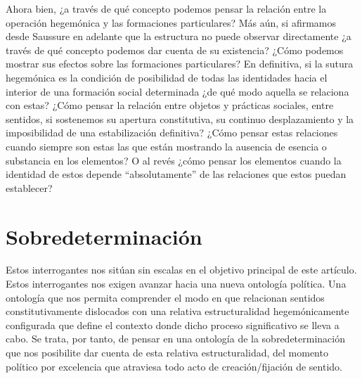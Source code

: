 Ahora bien, ¿a través de qué concepto podemos pensar la relación entre la operación hegemónica y las formaciones particulares? Más aún, si afirmamos desde Saussure en adelante que la estructura no puede observar directamente ¿a través de qué concepto podemos dar cuenta de su existencia? ¿Cómo podemos mostrar sus efectos sobre las formaciones particulares? En definitiva, si la sutura hegemónica es la condición de posibilidad de todas las identidades hacia el interior de una formación social determinada ¿de qué modo aquella se relaciona con estas? ¿Cómo pensar la relación entre objetos y prácticas sociales, entre sentidos, si sostenemos su apertura constitutiva, su continuo desplazamiento y la imposibilidad de una estabilización definitiva? ¿Cómo pensar estas relaciones cuando siempre son estas las que están mostrando la ausencia de esencia o substancia en los elementos? O al revés ¿cómo pensar los elementos cuando la identidad de estos depende \enquote{absolutamente} de las relaciones que estos puedan establecer?

\section{Sobredeterminación}

Estos interrogantes nos sitúan sin escalas en el objetivo principal de este artículo. Estos interrogantes nos exigen avanzar hacia una nueva ontología política. Una ontología que nos permita comprender el modo en que relacionan sentidos constitutivamente dislocados con una relativa estructuralidad hegemónicamente configurada que define el contexto donde dicho proceso significativo se lleva a cabo. Se trata, por tanto, de pensar en una ontología de la sobredeterminación que nos posibilite dar cuenta de esta relativa estructuralidad, del momento político por excelencia que atraviesa todo acto de creación/fijación de sentido.

